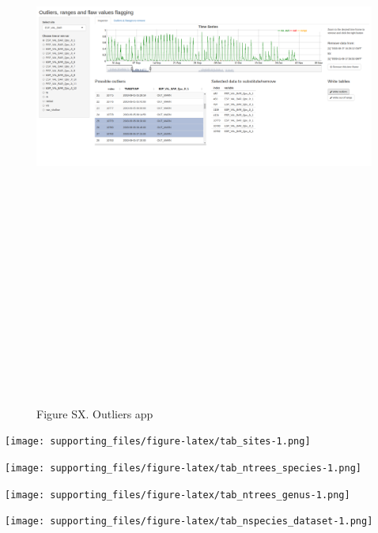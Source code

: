 \documentclass[]{article}
\begin{document}
\begin{figure}

{\centering \includegraphics[width=26.67in,height=800px]{resources/out_app} 

}

\caption{Figure SX. Outliers app}\label{fig:fig_outliers_app}
\end{figure}
\pagebreak

\texttt{[image: supporting\_files/figure-latex/tab\_sites-1.png]}

\pagebreak

\texttt{[image: supporting\_files/figure-latex/tab\_ntrees\_species-1.png]}

\pagebreak

\texttt{[image: supporting\_files/figure-latex/tab\_ntrees\_genus-1.png]}
\pagebreak

\texttt{[image: supporting\_files/figure-latex/tab\_nspecies\_dataset-1.png]}
\pagebreak
\end{document}
